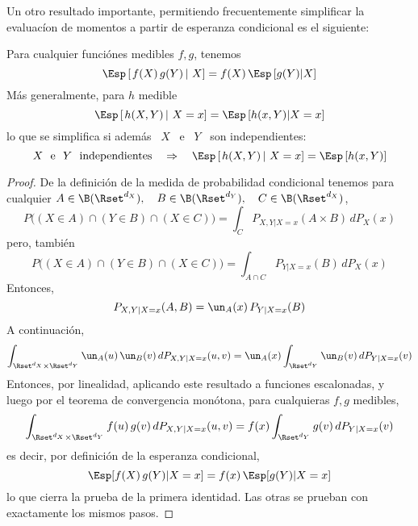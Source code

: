 Un  otro   resultado  importante,  permitiendo   frecuentemente  simplificar  la
evaluac\'ion de momentos a partir de esperanza condicional es el siguiente:
%
\begin{teorema}\label{Teo:MP:EsperanzaCondicionalFXY}
%
  Para cualquier funci\'ones medibles $f, g$, tenemos
  \[
  \Esp\left[ \left.  f(X) \, g(Y) \, \right|  \, X \right] =  f(X) \, \Esp\left[
    g(Y) | X\right]
  \]
  M\'as generalmente, para $h$ medible
  \[
  \Esp\left[ \left.  h(X,Y) \, \right|  \, X=x \right] =  \Esp\left[
    h(x,Y) | X=x\right]
  \]
  lo que se simplifica si adem\'as \ $X$ \ e \ $Y$ \ son independientes:
  \[
  \mbox{$X$  \ e  \ $Y$  \  independientes} \quad  \Rightarrow \quad  \Esp\left[
    \left.  h(X,Y) \, \right| \, X=x \right] = \Esp\left[ h(x,Y) \right]
  \]
\end{teorema}
%
\begin{proof}
  De  la definici\'on  de la  medida  de probabilidad  condicional tenemos  para
  cualquier $A  \in \B(\Rset^{d_X}),  \quad B \in  \B(\Rset^{d_Y}), \quad  C \in
  \B(\Rset^{d_X})$,
  \[
  P\big( (X \in  A) \cap (Y \in B)  \cap (X \in C) \big)  = \int_C P_{X,Y|X=x}(A
  \times B) \, dP_X(x)
  \]
  pero, tambi\'en
  \[
  P\big(  (X \in  A) \cap  (Y \in  B) \cap  (X \in  C) \big)  = \int_{A  \cap C}
  P_{Y|X=x}(B) \, dP_X(x)
  \]
  Entonces,
  \[
  P_{X,Y|X=x}(A,B) = \un_A(x) \, P_{Y|X=x}(B)
  \]
  A continuaci\'on,
  \[
  \int_{\Rset^{d_X}    \times    \Rset^{d_Y}}    \un_A(u)   \,    \un_B(v)    \,
  dP_{X,Y|X=x}(u,v) = \un_A(x) \int_{\Rset^{d_Y}} \un_B(v) \, dP_{Y|X=x}(v)
  \]
  Entonces, por linealidad, aplicando  este resultado a funciones escalonadas, y
  luego  por el  teorema de  convergencia  mon\'otona, para  cualquieras $f,  g$
  medibles,
  \[
  \int_{\Rset^{d_X}  \times \Rset^{d_Y}}  f(u) \, g(v)  \, dP_{X,Y|X=x}(u,v) =
  f(x) \int_{\Rset^{d_Y}} g(v) \, dP_{Y|X=x}(v)
  \]
  es decir, por definici\'on de la esperanza condicional,
  \[
  \Esp[ f(X) \, g(Y) | X = x] = f(x) \, \Esp[g(Y) | X=x]
  \]
  lo que  cierra la  prueba de la  primera identidad.  Las otras se  prueban con
  exactamente los mismos pasos.
\end{proof}

